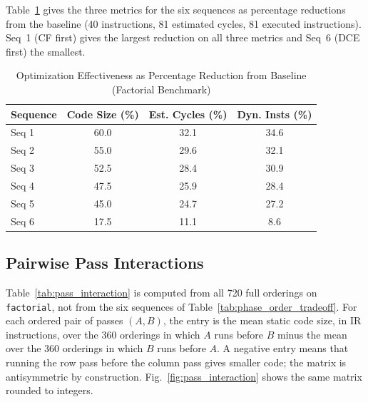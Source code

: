 \documentclass[conference]{IEEEtran}
\begin{document}
Table~\ref{tab:optimization_reduction} gives the three metrics for the six sequences as percentage reductions from the baseline (40 instructions, 81 estimated cycles, 81 executed instructions). Seq~1 (CF first) gives the largest reduction on all three metrics and Seq~6 (DCE first) the smallest.

\begin{table}[!htbp]
\centering
\caption{Optimization Effectiveness as Percentage Reduction from Baseline (Factorial Benchmark)}
\label{tab:optimization_reduction}
\renewcommand{\arraystretch}{1.2}
\begin{tabularx}{\columnwidth}{@{}Xccc@{}}
\toprule
\textbf{Sequence} & \textbf{Code Size (\%)} & \textbf{Est. Cycles (\%)} & \textbf{Dyn. Insts (\%)} \\
\midrule
Seq 1 & 60.0 & 32.1 & 34.6 \\
Seq 2 & 55.0 & 29.6 & 32.1 \\
Seq 3 & 52.5 & 28.4 & 30.9 \\
Seq 4 & 47.5 & 25.9 & 28.4 \\
Seq 5 & 45.0 & 24.7 & 27.2 \\
Seq 6 & 17.5 & 11.1 & 8.6 \\
\bottomrule
\end{tabularx}
\end{table}

\subsection{Pairwise Pass Interactions}
\label{sec:interaction}
Table~\ref{tab:pass_interaction} is computed from all 720 full orderings on \texttt{factorial}, not from the six sequences of Table~\ref{tab:phase_order_tradeoff}. For each ordered pair of passes $(A, B)$, the entry is the mean static code size, in IR instructions, over the 360 orderings in which $A$ runs before $B$ minus the mean over the 360 orderings in which $B$ runs before $A$. A negative entry means that running the row pass before the column pass gives smaller code; the matrix is antisymmetric by construction. Fig.~\ref{fig:pass_interaction} shows the same matrix rounded to integers.
\end{document}
